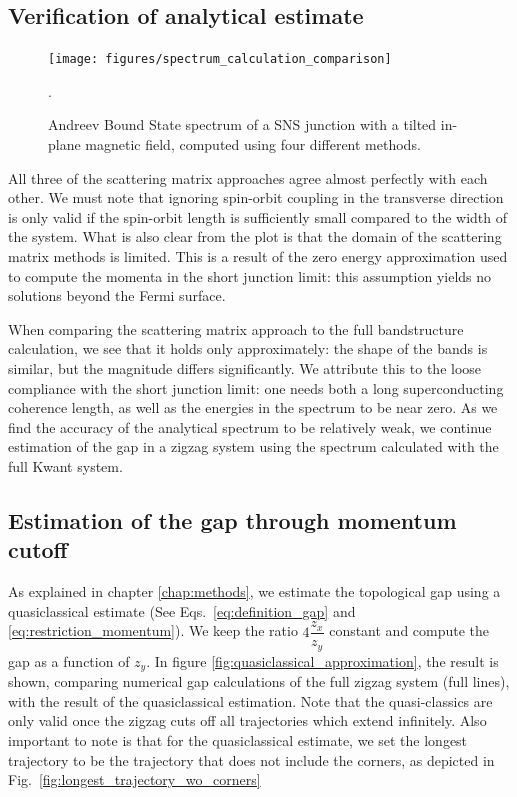 		\subsection{Verification of analytical estimate}
			\begin{figure}[!htb]
			\centering
			\texttt{[image: figures/spectrum\_calculation\_comparison]}
			\caption{Andreev Bound State spectrum of a SNS junction with a tilted in-plane magnetic field, computed using four different methods.}.
			\label{fig:spectrum_calculation_comparison}
			\end{figure}

			All three of the scattering matrix approaches agree almost perfectly with each other.
			We must note that ignoring spin-orbit coupling in the transverse direction is only valid if the spin-orbit length is sufficiently small compared to the width of the system.
			What is also clear from the plot is that the domain of the scattering matrix methods is limited.
			This is a result of the zero energy approximation used to compute the momenta in the short junction limit: this assumption yields no solutions beyond the Fermi surface.

			When comparing the scattering matrix approach to the full bandstructure calculation, we see that it holds only approximately: the shape of the bands is similar, but the magnitude differs significantly.
			We attribute this to the loose compliance with the short junction limit: one needs both a long superconducting coherence length, as well as the energies in the spectrum to be near zero.
			As we find the accuracy of the analytical spectrum to be relatively weak, we continue estimation of the gap in a zigzag system using the spectrum calculated with the full Kwant system.

		\subsection{Estimation of the gap through momentum cutoff}
			As explained in chapter \ref{chap:methods}, we estimate the topological gap using a quasiclassical estimate (See Eqs.~\eqref{eq:definition_gap} and \eqref{eq:restriction_momentum}).
			We keep the ratio $4\dfrac{z_x}{z_y}$ constant and compute the gap as a function of $z_y$.
			In figure \ref{fig:quasiclassical_approximation}, the result is shown, comparing numerical gap calculations of the full zigzag system (full lines), with the result of the quasiclassical estimation.
			Note that the quasi-classics are only valid once the zigzag cuts off all trajectories which extend infinitely.
			Also important to note is that for the quasiclassical estimate, we set the longest trajectory to be the trajectory that does not include the corners, as depicted in Fig.~\ref{fig:longest_trajectory_wo_corners}

